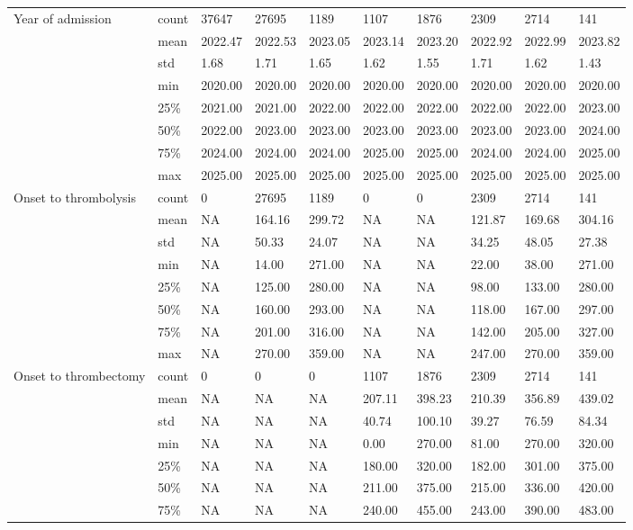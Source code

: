 \begin{landscape}
{\begin{longtable}[]{@{}llllllllll@{}}
Year of admission & count & 37647 & 27695 & 1189 & 1107 & 1876 & 2309 & 2714 & 141 \\
& mean & 2022.47 & 2022.53 & 2023.05 & 2023.14 & 2023.20 & 2022.92 & 2022.99 & 2023.82 \\
& std & 1.68 & 1.71 & 1.65 & 1.62 & 1.55 & 1.71 & 1.62 & 1.43 \\
& min & 2020.00 & 2020.00 & 2020.00 & 2020.00 & 2020.00 & 2020.00 & 2020.00 & 2020.00 \\
& 25\% & 2021.00 & 2021.00 & 2022.00 & 2022.00 & 2022.00 & 2022.00 & 2022.00 & 2023.00 \\
& 50\% & 2022.00 & 2023.00 & 2023.00 & 2023.00 & 2023.00 & 2023.00 & 2023.00 & 2024.00 \\
& 75\% & 2024.00 & 2024.00 & 2024.00 & 2025.00 & 2025.00 & 2024.00 & 2024.00 & 2025.00 \\
& max & 2025.00 & 2025.00 & 2025.00 & 2025.00 & 2025.00 & 2025.00 & 2025.00 & 2025.00 \\
Onset to thrombolysis & count & 0 & 27695 & 1189 & 0 & 0 & 2309 & 2714 & 141 \\
& mean & NA & 164.16 & 299.72 & NA & NA & 121.87 & 169.68 & 304.16 \\
& std & NA & 50.33 & 24.07 & NA & NA & 34.25 & 48.05 & 27.38 \\
& min & NA & 14.00 & 271.00 & NA & NA & 22.00 & 38.00 & 271.00 \\
& 25\% & NA & 125.00 & 280.00 & NA & NA & 98.00 & 133.00 & 280.00 \\
& 50\% & NA & 160.00 & 293.00 & NA & NA & 118.00 & 167.00 & 297.00 \\
& 75\% & NA & 201.00 & 316.00 & NA & NA & 142.00 & 205.00 & 327.00 \\
& max & NA & 270.00 & 359.00 & NA & NA & 247.00 & 270.00 & 359.00 \\
Onset to thrombectomy & count & 0 & 0 & 0 & 1107 & 1876 & 2309 & 2714 & 141 \\
& mean & NA & NA & NA & 207.11 & 398.23 & 210.39 & 356.89 & 439.02 \\
& std & NA & NA & NA & 40.74 & 100.10 & 39.27 & 76.59 & 84.34 \\
& min & NA & NA & NA & 0.00 & 270.00 & 81.00 & 270.00 & 320.00 \\
& 25\% & NA & NA & NA & 180.00 & 320.00 & 182.00 & 301.00 & 375.00 \\
& 50\% & NA & NA & NA & 211.00 & 375.00 & 215.00 & 336.00 & 420.00 \\
& 75\% & NA & NA & NA & 240.00 & 455.00 & 243.00 & 390.00 & 483.00 \\

\end{longtable}}
\end{landscape}
